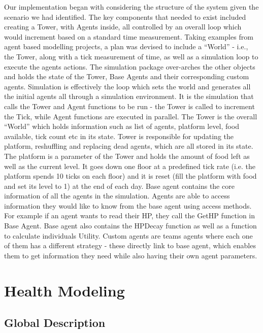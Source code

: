 Our implementation began with considering the structure of the system given the scenario we had identified. The key components that needed to exist included creating a Tower, with Agents inside, all controlled by an overall loop which would increment based on a standard time measurement. 
Taking examples from agent based modelling projects, a plan was devised to include a “World” - i.e., the Tower, along with a tick measurement of time, as well as a simulation loop to execute the agents actions. 
The simulation package over-arches the other objects and holds the state of the Tower, Base Agents and their corresponding custom agents. Simulation is effectively the loop which sets the world and generates all the initial agents all through a simulation environment. It is the simulation that calls the Tower and Agent functions to be run - the Tower is called to increment the Tick, while Agent functions are executed in parallel. 
The Tower is the overall “World” which holds information such as list of agents, platform level, food available, tick count etc in its state. Tower is responsible for updating the platform, reshuffling and replacing dead agents, which are all stored in its state. 
The platform is a parameter of the Tower and holds the amount of food left as well as the current level. It goes down one floor at a predefined tick rate (i.e. the platform spends 10 ticks on each floor) and it is reset (fill the platform with food and set its level to 1) at the end of each day.
Base agent contains the core information of all the agents in the simulation.  Agents are able to access information they would like to know from the base agent using access methods. For example if an agent wants to read their HP, they call the GetHP function in Base Agent. Base agent also contains the HPDecay function as well as a function to calculate individuals Utility. 
Custom agents are teams agents where each one of them has a different strategy - these directly link to base agent, which enables them to get information they need while also having their own agent parameters. 

\section{Health Modeling}\label{health_modeling}

%
%
\subsection{Global Description}

